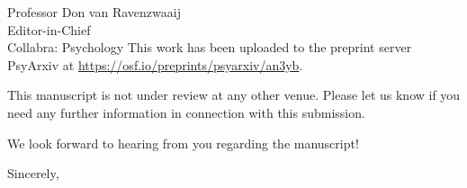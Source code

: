 \documentclass{stanfordletter}
\begin{document}
\begin{letter}{Professor Don van Ravenzwaaij \\ Editor-in-Chief \\ Collabra: Psychology }
          This work has been uploaded to the preprint server PsyArxiv at \url{https://osf.io/preprints/psyarxiv/an3yb}. 
          
          
          This manuscript is not under review at any other venue. Please let us know if you need any further information in
          connection with this submission. 
          
          We look forward to hearing from you regarding the manuscript!
          
          \closing{Sincerely,}
		
%		
%		
%		
%		
%		
%		
%		
	\end{letter}
	
\end{document}
